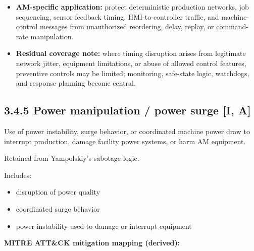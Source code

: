 \documentclass[10pt,a4paper,oneside]{report}
\begin{document}
\begin{itemize}
\item \textbf{AM-specific application:} protect deterministic production networks, job sequencing, sensor feedback timing, HMI-to-controller traffic, and machine-control messages from unauthorized reordering, delay, replay, or command-rate manipulation.
\end{itemize}

\begin{itemize}
\item \textbf{Residual coverage note:} where timing disruption arises from legitimate network jitter, equipment limitations, or abuse of allowed control features, preventive controls may be limited; monitoring, safe-state logic, watchdogs, and response planning become central.
\end{itemize}


\subsection{3.4.5 Power manipulation / power surge [I, A]}


Use of power instability, surge behavior, or coordinated machine power draw to interrupt production, damage facility power systems, or harm AM equipment.

Retained from Yampolskiy's sabotage logic.

Includes:

\begin{itemize}
\item disruption of power quality
\item coordinated surge behavior
\item power instability used to damage or interrupt equipment
\end{itemize}

\textbf{MITRE ATT\&CK mitigation mapping (derived):}
\end{document}

